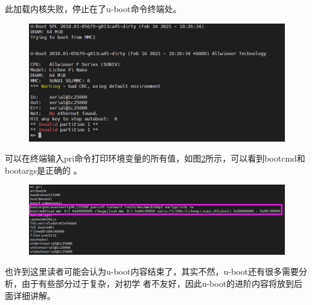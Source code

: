 此加载内核失败，停止在了u-boot命令终端处。
\begin{figure}[htbp]
	\centering
	\includegraphics[width=1\linewidth]{chapter2/img/ubootstart}
	\caption{}
	\label{fig:ubootstart}
\end{figure}
可以在终端输入pri命令打印环境变量的所有值，如图\ref{fig:bootpri}所示，可以看到bootcmd和bootargs是正确的
。
\begin{figure}[htbp]
	\centering
	\includegraphics[width=1\linewidth]{chapter2/img/bootpri}
	\caption{}
	\label{fig:bootpri}
\end{figure}


也许到这里读者可能会认为u-boot内容结束了，其实不然，u-boot还有很多需要分析，由于有些部分过于复杂，对初学
者不友好，因此u-boot的进阶内容将放到后面详细讲解。


